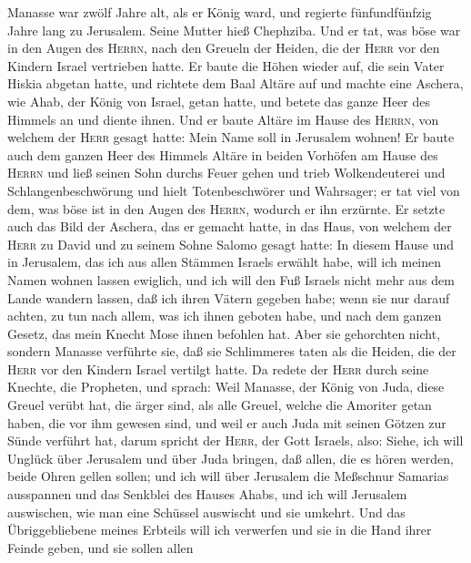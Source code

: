  Manasse war zwölf Jahre alt, als er König ward, und
regierte fünfundfünfzig Jahre lang zu Jerusalem. Seine Mutter hieß
Chephziba.  Und er tat, was böse war in den Augen des
\textsc{Herrn}, nach den Greueln der Heiden, die der \textsc{Herr} vor
den Kindern Israel vertrieben hatte.  Er baute die Höhen
wieder auf, die sein Vater Hiskia abgetan hatte, und richtete dem Baal
Altäre auf und machte eine Aschera, wie Ahab, der König von Israel,
getan hatte, und betete das ganze Heer des Himmels an und diente ihnen.
 Und er baute Altäre im Hause des \textsc{Herrn}, von
welchem der \textsc{Herr} gesagt hatte: Mein Name soll in Jerusalem
wohnen!  Er baute auch dem ganzen Heer des Himmels Altäre
in beiden Vorhöfen am Hause des \textsc{Herrn}  und ließ
seinen Sohn durchs Feuer gehen und trieb Wolkendeuterei und
Schlangenbeschwörung und hielt Totenbeschwörer und Wahrsager; er tat
viel von dem, was böse ist in den Augen des \textsc{Herrn}, wodurch er
ihn erzürnte.  Er setzte auch das Bild der Aschera, das er
gemacht hatte, in das Haus, von welchem der \textsc{Herr} zu David und
zu seinem Sohne Salomo gesagt hatte: In diesem Hause und in Jerusalem,
das ich aus allen Stämmen Israels erwählt habe, will ich meinen Namen
wohnen lassen ewiglich,  und ich will den Fuß Israels
nicht mehr aus dem Lande wandern lassen, daß ich ihren Vätern gegeben
habe; wenn sie nur darauf achten, zu tun nach allem, was ich ihnen
geboten habe, und nach dem ganzen Gesetz, das mein Knecht Mose ihnen
befohlen hat.  Aber sie gehorchten nicht, sondern Manasse
verführte sie, daß sie Schlimmeres taten als die Heiden, die der
\textsc{Herr} vor den Kindern Israel vertilgt hatte.  Da
redete der \textsc{Herr} durch seine Knechte, die Propheten, und sprach:
 Weil Manasse, der König von Juda, diese Greuel verübt
hat, die ärger sind, als alle Greuel, welche die Amoriter getan haben,
die vor ihm gewesen sind, und weil er auch Juda mit seinen Götzen zur
Sünde verführt hat,  darum spricht der \textsc{Herr}, der
Gott Israels, also: Siehe, ich will Unglück über Jerusalem und über Juda
bringen, daß allen, die es hören werden, beide Ohren gellen sollen;
 und ich will über Jerusalem die Meßschnur Samarias
ausspannen und das Senkblei des Hauses Ahabs, und ich will Jerusalem
auswischen, wie man eine Schüssel auswischt und sie umkehrt.
 Und das Übriggebliebene meines Erbteils will ich
verwerfen und sie in die Hand ihrer Feinde geben, und sie sollen allen
